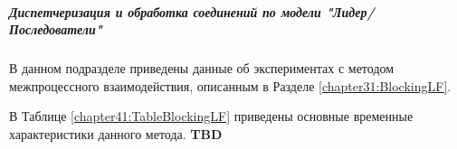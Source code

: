 \begin{table}[!h]
\caption{Основные показатели временной задержки на передачу данных между процессами для метода, использующего разделяемую память для передачи данных, блокирующий мультиплексор в разделяемой памяти и модель ''Полусинхронный/Полуреактивный`` при обслуживании заявок}\label{chapter41:TableBlockingHSHA}
\centering
{}
\end{table}

\subparagraph{Диспетчеризация и обработка соединений по модели "Лидер/Последователи"}


В данном подразделе приведены данные об экспериментах с методом межпроцессного взаимодействия, описанным в Разделе \ref{chapter31:BlockingLF}.

В Таблице \ref{chapter41:TableBlockingLF} приведены основные временные характеристики данного метода. \textbf{TBD}

